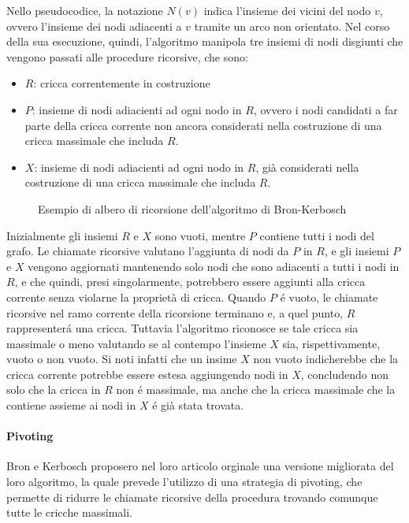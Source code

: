 Nello pseudocodice, la notazione $N(v)$ indica l'insieme dei vicini del nodo $v$, ovvero l'insieme dei nodi adiacenti
a $v$ tramite un arco non orientato.
Nel corso della sua esecuzione, quindi, l'algoritmo manipola tre insiemi di nodi disgiunti che vengono passati
alle procedure ricorsive, che sono:
\begin{itemize}
    \item $R$: cricca correntemente in costruzione
    \item $P$: insieme di nodi adiacienti ad ogni nodo in $R$, ovvero i nodi candidati a far parte della cricca corrente
    non ancora considerati nella costruzione di una cricca massimale che includa $R$.
    \item $X$: insieme di nodi adiacienti ad ogni nodo in $R$, gi\`a considerati nella costruzione di una cricca
    massimale che includa $R$.
\end{itemize}

\begin{figure}[H]
    \centering
    
    \caption{Esempio di albero di ricorsione dell'algoritmo di Bron-Kerbosch}
    \label{fig:bron_kerbosh_tree_example}
\end{figure}

Inizialmente gli insiemi $R$ e $X$ sono vuoti, mentre $P$ contiene tutti i nodi del grafo.
Le chiamate ricorsive valutano l'aggiunta di nodi da $P$ in $R$, e gli insiemi $P$ e $X$ vengono aggiornati
mantenendo solo nodi che sono adiacenti a tutti i nodi in $R$, e che quindi, presi singolarmente, potrebbero
essere aggiunti alla cricca corrente senza violarne la propriet\`a di cricca.
Quando $P$ \'e vuoto, le chiamate ricorsive nel ramo corrente della ricorsione terminano e, a quel punto,
$R$ rappresenter\'a una cricca.
Tuttavia l'algoritmo riconosce se tale cricca sia massimale o meno valutando se al contempo l'insieme $X$ sia,
rispettivamente, vuoto o non vuoto.
Si noti infatti che un insime $X$ non vuoto indicherebbe che la cricca corrente potrebbe essere estesa aggiungendo
nodi in $X$, concludendo non solo che la cricca in $R$ non \'e massimale, ma anche che la cricca massimale che
la contiene assieme ai nodi in $X$ \'e gi\`a stata trovata. \newline

\paragraph{Pivoting}
Bron e Kerbosch proposero nel loro articolo orginale una versione migliorata del loro algoritmo, la quale
prevede l'utilizzo di una strategia di pivoting, che permette di ridurre le chiamate ricorsive della procedura
trovando comunque tutte le cricche massimali.

